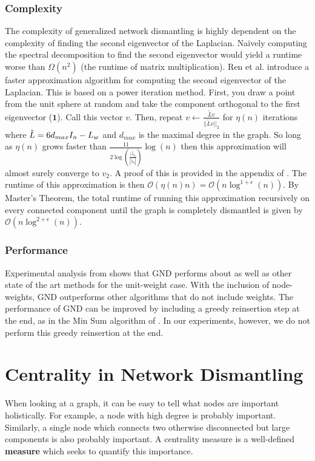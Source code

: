 \documentclass{article}
\begin{document}
\subsubsection{Complexity}
The complexity of generalized network dismantling is highly dependent on the complexity of finding the second eigenvector of the Laplacian. Naïvely computing the spectral decomposition to find the second eigenvector would yield a runtime worse than $\Omega(n^2)$ (the runtime of matrix multiplication). 
Ren et al. \cite{gnd} introduce a faster approximation algorithm for computing the second eigenvector of the Laplacian. This is based on a power iteration method. 
First, you draw a point from the unit sphere at random and take the component orthogonal to the first eigenvector ($\mathbf{1}$). 
Call this vector $v$. 
Then, repeat $v \leftarrow \frac{\tilde{L}v}{||\tilde{L}v||_2}$ for $\eta(n)$ iterations where $\Tilde{L} = 6d_{max}I_n - L_w$ and $d_{max}$ is the maximal degree in the graph. 
So long as $\eta(n)$ grows faster than $\frac{11}{2\log(\frac{|\tilde{\lambda_2}}{|\tilde{\lambda_3}|})} \log(n)$ then this approximation will almost surely converge to $v_2$. 
A proof of this is provided in the appendix of \cite{gnd}. 
The runtime of this approximation is then $\mathcal{O}(\eta(n)n) = \mathcal{O}(n\log^{1+\epsilon}(n))$. By Master's Theorem, the total runtime of running this approximation recursively on every connected component until the graph is completely dismantled is given by $\mathcal{O}(n\log^{2+\epsilon}(n))$.

\subsubsection{Performance}
Experimental analysis from \cite{gnd} shows that GND performs about as well as other state of the art methods for the unit-weight case. 
With the inclusion of node-weights, GND outperforms other algorithms that do not include weights. 
The performance of GND can be improved by including a greedy reinsertion step at the end, as in the Min Sum algorithm of \cite{braunstein}.
In our experiments, however, we do not perform this greedy reinsertion at the end.


\section{Centrality in Network Dismantling}
 When looking at a graph, it can be easy to tell what nodes are important holistically. For example, a node with high degree is probably important. Similarly, a single node which connects two otherwise disconnected but large components is also probably important. A centrality measure is a well-defined \textbf{measure} which seeks to quantify this importance. 
 
\end{document}
